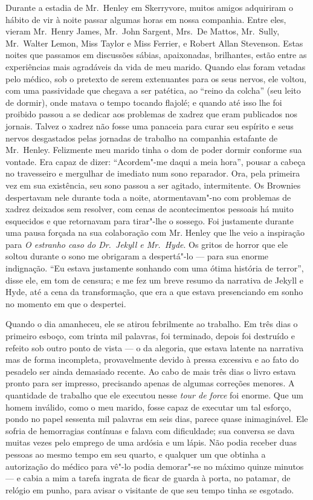 Durante a estadia de Mr.~Henley em Skerryvore, muitos amigos adquiriram
o hábito de vir à noite passar algumas horas em nossa companhia. 
Entre eles, vieram Mr.~Henry James, Mr.~John Sargent, Mrs.~De Mattos,
Mr.~Sully, Mr.~Walter Lemon, Miss Taylor e Miss Ferrier, e Robert Allan
Stevenson.  Estas noites que passamos em discussões sábias,
apaixonadas, brilhantes, estão entre as experiências mais agradáveis da
vida de meu marido.  Quando elas foram vetadas pelo médico, sob o
pretexto de serem extenuantes para os seus nervos, ele voltou, com uma
passividade que chegava a ser patética, ao “reino da colcha” (seu leito
de dormir), onde matava o tempo tocando flajolé; e quando até isso lhe
foi proibido passou a se dedicar aos problemas de xadrez que eram
publicados nos jornais.  Talvez o xadrez não fosse uma panaceia para
curar seu espírito e seus nervos desgastados pelas jornadas de trabalho
na companhia estafante de Mr.~Henley.  Felizmente meu marido tinha o
dom de poder dormir conforme sua vontade.  Era capaz de dizer:
“Acordem"-me daqui a meia hora”, pousar a cabeça no travesseiro e
mergulhar de imediato num sono reparador.  Ora, pela primeira vez em
sua existência, seu sono passou a ser agitado, intermitente.  Os
Brownies despertavam nele durante toda a noite, atormentavam"-no com
problemas de xadrez deixados sem resolver, com cenas de acontecimentos
pessoais há muito esquecidos e que retornavam para tirar"-lhe o sossego.
 Foi justamente durante uma pausa forçada na sua colaboração com Mr.
Henley que lhe veio a inspiração para \textit{O estranho caso do 
Dr.~Jekyll e Mr.~Hyde}.  Os gritos de horror que ele soltou durante o sono
me obrigaram a despertá"-lo --- para sua enorme indignação.  “Eu estava
justamente sonhando com uma ótima história de terror”, disse ele, em
tom de censura; e me fez um breve resumo da narrativa de Jekyll e Hyde,
até a cena da transformação, que era a que estava presenciando em sonho
no momento em que o despertei.

Quando o dia amanheceu, ele se atirou febrilmente ao trabalho.  Em três
dias o primeiro esboço, com trinta mil palavras, foi terminado, depois
foi destruído e refeito sob outro ponto de vista --- o da alegoria, que
estava latente na narrativa mas de forma incompleta, provavelmente
devido à pressa excessiva e ao fato do pesadelo ser ainda demasiado
recente.  Ao cabo de mais três dias o livro estava pronto para ser
impresso, precisando apenas de algumas correções menores.  A quantidade
de trabalho que ele executou nesse \textit{tour de force} foi enorme. 
Que um homem inválido, como o meu marido, fosse capaz de executar um
tal esforço, pondo no papel sessenta mil palavras em seis dias, parece
quase inimaginável.  Ele sofria de hemorragias contínuas e falava com
dificuldade; sua conversa se dava muitas vezes pelo emprego de uma
ardósia e um lápis.  Não podia receber duas pessoas ao mesmo tempo em
seu quarto, e qualquer um que obtinha a autorização do médico para
vê"-lo podia demorar"-se no máximo quinze minutos --- e cabia a mim a
tarefa ingrata de ficar de guarda à porta, no patamar, de relógio em
punho, para avisar o visitante de que seu tempo tinha se esgotado.

